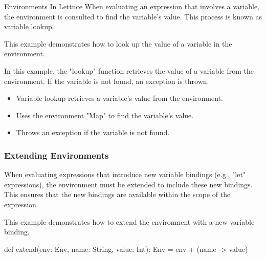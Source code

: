 \begin{notes}{Environments In Lettuce}
    When evaluating an expression that involves a variable, the environment is consulted to find the variable's value. This process is known as variable lookup.
    
    \begin{highlight}
    
        This example demonstrates how to look up the value of a variable in the environment.
    
    
        In this example, the "lookup" function retrieves the value of a variable from the environment. If the variable is not found, an exception is thrown.
        
        \begin{itemize}
            \item Variable lookup retrieves a variable's value from the environment.
            \item Uses the environment "Map" to find the variable's value.
            \item Throws an exception if the variable is not found.
        \end{itemize}
    
    \end{highlight}
    
    \subsubsection*{Extending Environments}
    
    When evaluating expressions that introduce new variable bindings (e.g., "let" expressions), the environment must be extended to include these new bindings. This ensures that the new bindings are 
    available within the scope of the expression.
    
    \begin{highlight}
    
        This example demonstrates how to extend the environment with a new variable binding.
    
    \begin{code}[Scala]
    def extend(env: Env, name: String, value: Int): Env = {
        env + (name -> value)
    }
    \end{code}
    

\end{highlight}
\end{notes}
